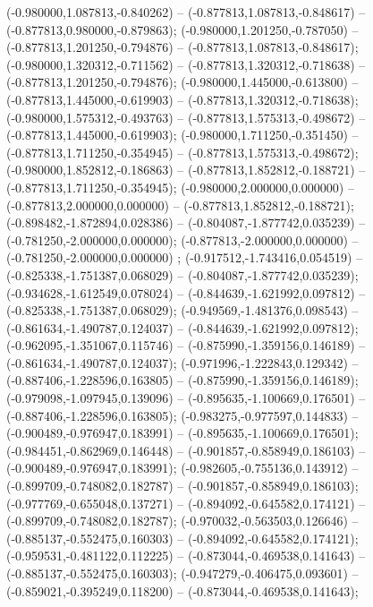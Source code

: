  (-0.980000,1.087813,-0.840262) -- (-0.877813,1.087813,-0.848617) -- (-0.877813,0.980000,-0.879863);
 (-0.980000,1.201250,-0.787050) -- (-0.877813,1.201250,-0.794876) -- (-0.877813,1.087813,-0.848617);
 (-0.980000,1.320312,-0.711562) -- (-0.877813,1.320312,-0.718638) -- (-0.877813,1.201250,-0.794876);
 (-0.980000,1.445000,-0.613800) -- (-0.877813,1.445000,-0.619903) -- (-0.877813,1.320312,-0.718638);
 (-0.980000,1.575312,-0.493763) -- (-0.877813,1.575313,-0.498672) -- (-0.877813,1.445000,-0.619903);
 (-0.980000,1.711250,-0.351450) -- (-0.877813,1.711250,-0.354945) -- (-0.877813,1.575313,-0.498672);
 (-0.980000,1.852812,-0.186863) -- (-0.877813,1.852812,-0.188721) -- (-0.877813,1.711250,-0.354945);
 (-0.980000,2.000000,0.000000) -- (-0.877813,2.000000,0.000000) -- (-0.877813,1.852812,-0.188721);
 (-0.898482,-1.872894,0.028386) -- (-0.804087,-1.877742,0.035239) -- (-0.781250,-2.000000,0.000000);
 (-0.877813,-2.000000,0.000000) -- (-0.781250,-2.000000,0.000000) ;
 (-0.917512,-1.743416,0.054519) -- (-0.825338,-1.751387,0.068029) -- (-0.804087,-1.877742,0.035239);
 (-0.934628,-1.612549,0.078024) -- (-0.844639,-1.621992,0.097812) -- (-0.825338,-1.751387,0.068029);
 (-0.949569,-1.481376,0.098543) -- (-0.861634,-1.490787,0.124037) -- (-0.844639,-1.621992,0.097812);
 (-0.962095,-1.351067,0.115746) -- (-0.875990,-1.359156,0.146189) -- (-0.861634,-1.490787,0.124037);
 (-0.971996,-1.222843,0.129342) -- (-0.887406,-1.228596,0.163805) -- (-0.875990,-1.359156,0.146189);
 (-0.979098,-1.097945,0.139096) -- (-0.895635,-1.100669,0.176501) -- (-0.887406,-1.228596,0.163805);
 (-0.983275,-0.977597,0.144833) -- (-0.900489,-0.976947,0.183991) -- (-0.895635,-1.100669,0.176501);
 (-0.984451,-0.862969,0.146448) -- (-0.901857,-0.858949,0.186103) -- (-0.900489,-0.976947,0.183991);
 (-0.982605,-0.755136,0.143912) -- (-0.899709,-0.748082,0.182787) -- (-0.901857,-0.858949,0.186103);
 (-0.977769,-0.655048,0.137271) -- (-0.894092,-0.645582,0.174121) -- (-0.899709,-0.748082,0.182787);
 (-0.970032,-0.563503,0.126646) -- (-0.885137,-0.552475,0.160303) -- (-0.894092,-0.645582,0.174121);
 (-0.959531,-0.481122,0.112225) -- (-0.873044,-0.469538,0.141643) -- (-0.885137,-0.552475,0.160303);
 (-0.947279,-0.406475,0.093601) -- (-0.859021,-0.395249,0.118200) -- (-0.873044,-0.469538,0.141643);
